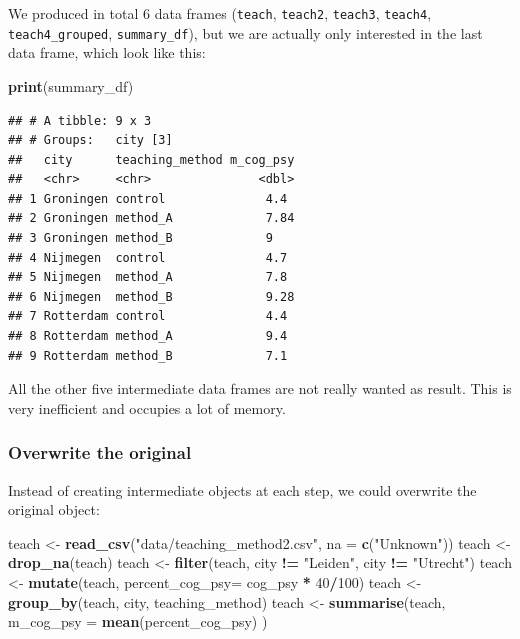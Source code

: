 \documentclass[
]{scrartcl}
\newenvironment{Shaded}{\begin{snugshade}}{\end{snugshade}}
\newcommand{\DataTypeTok}[1]{\textcolor[rgb]{0.13,0.29,0.53}{#1}}
\newcommand{\DecValTok}[1]{\textcolor[rgb]{0.00,0.00,0.81}{#1}}
\newcommand{\KeywordTok}[1]{\textcolor[rgb]{0.13,0.29,0.53}{\textbf{#1}}}
\newcommand{\NormalTok}[1]{#1}
\newcommand{\OperatorTok}[1]{\textcolor[rgb]{0.81,0.36,0.00}{\textbf{#1}}}
\newcommand{\StringTok}[1]{\textcolor[rgb]{0.31,0.60,0.02}{#1}}
\begin{document}
We produced in total 6 data frames (\texttt{teach}, \texttt{teach2}, \texttt{teach3}, \texttt{teach4}, \texttt{teach4\_grouped}, \texttt{summary\_df}), but we are actually only interested in the last data frame, which look like this:

\begin{Shaded}
\begin{Highlighting}[]
\KeywordTok{print}\NormalTok{(summary\_df)}
\end{Highlighting}
\end{Shaded}

\begin{verbatim}
## # A tibble: 9 x 3
## # Groups:   city [3]
##   city      teaching_method m_cog_psy
##   <chr>     <chr>               <dbl>
## 1 Groningen control              4.4 
## 2 Groningen method_A             7.84
## 3 Groningen method_B             9   
## 4 Nijmegen  control              4.7 
## 5 Nijmegen  method_A             7.8 
## 6 Nijmegen  method_B             9.28
## 7 Rotterdam control              4.4 
## 8 Rotterdam method_A             9.4 
## 9 Rotterdam method_B             7.1
\end{verbatim}

All the other five intermediate data frames are not really wanted as result. This is very inefficient and occupies a lot of memory.

\hypertarget{overwrite-the-original}{%
\subsubsection{Overwrite the original}\label{overwrite-the-original}}

Instead of creating intermediate objects at each step, we could overwrite the original object:

\begin{Shaded}
\begin{Highlighting}[]
\NormalTok{teach \textless{}{-}}\StringTok{ }\KeywordTok{read\_csv}\NormalTok{(}\StringTok{"data/teaching\_method2.csv"}\NormalTok{, }\DataTypeTok{na =} \KeywordTok{c}\NormalTok{(}\StringTok{"Unknown"}\NormalTok{))}
\NormalTok{teach \textless{}{-}}\StringTok{ }\KeywordTok{drop\_na}\NormalTok{(teach)}
\NormalTok{teach \textless{}{-}}\StringTok{ }\KeywordTok{filter}\NormalTok{(teach, city }\OperatorTok{!=}\StringTok{ "Leiden"}\NormalTok{, city }\OperatorTok{!=}\StringTok{ "Utrecht"}\NormalTok{)}
\NormalTok{teach \textless{}{-}}\StringTok{ }\KeywordTok{mutate}\NormalTok{(teach, }\DataTypeTok{percent\_cog\_psy=}\NormalTok{ cog\_psy }\OperatorTok{*}\StringTok{ }\DecValTok{40}\OperatorTok{/}\DecValTok{100}\NormalTok{)}
\NormalTok{teach \textless{}{-}}\StringTok{ }\KeywordTok{group\_by}\NormalTok{(teach, city, teaching\_method)}
\NormalTok{teach \textless{}{-}}\StringTok{ }\KeywordTok{summarise}\NormalTok{(teach, }\DataTypeTok{m\_cog\_psy =} \KeywordTok{mean}\NormalTok{(percent\_cog\_psy) )}
\end{Highlighting}
\end{Shaded}
\end{document}
